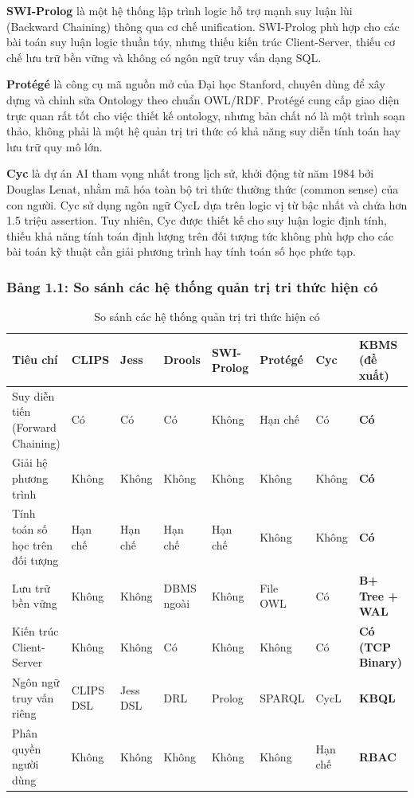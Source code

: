 \documentclass[13pt,a4paper,oneside]{extreport}
\begin{document}
\textbf{SWI-Prolog} \cite{SWIProlog} là một hệ thống lập trình logic hỗ trợ mạnh suy luận lùi (Backward Chaining) thông qua cơ chế unification. SWI-Prolog phù hợp cho các bài toán suy luận logic thuần túy, nhưng thiếu kiến trúc Client-Server, thiếu cơ chế lưu trữ bền vững và không có ngôn ngữ truy vấn dạng SQL.


\textbf{Protégé} \cite{StanfordProtege} là công cụ mã nguồn mở của Đại học Stanford, chuyên dùng để xây dựng và chỉnh sửa Ontology theo chuẩn OWL/RDF. Protégé cung cấp giao diện trực quan rất tốt cho việc thiết kế ontology, nhưng bản chất nó là một trình soạn thảo, không phải là một hệ quản trị tri thức có khả năng suy diễn tính toán hay lưu trữ quy mô lớn.


\textbf{Cyc} \cite{LenatCyc} là dự án AI tham vọng nhất trong lịch sử, khởi động từ năm 1984 bởi Douglas Lenat, nhằm mã hóa toàn bộ tri thức thường thức (common sense) của con người. Cyc sử dụng ngôn ngữ CycL dựa trên logic vị từ bậc nhất và chứa hơn 1.5 triệu assertion. Tuy nhiên, Cyc được thiết kế cho suy luận logic định tính, thiếu khả năng tính toán định lượng trên đối tượng  tức không phù hợp cho các bài toán kỹ thuật cần giải phương trình hay tính toán số học phức tạp.


\subsubsection{Bảng 1.1: So sánh các hệ thống quản trị tri thức hiện có}


\begin{table}[H]
  \centering\captionsetup{position=below}\footnotesize\selectfont
  \begin{tabularx}{\textwidth}{|l|L|L|L|L|L|L|L|}
  \hline
Tiêu chí & CLIPS & Jess & Drools & SWI-Prolog & Protégé & Cyc & \textbf{KBMS (đề xuất)} \\ \hline
Suy diễn tiến (Forward Chaining) & Có & Có & Có & Không & Hạn chế & Có & \textbf{Có} \\ \hline
Giải hệ phương trình & Không & Không & Không & Không & Không & Không & \textbf{Có} \\ \hline
Tính toán số học trên đối tượng & Hạn chế & Hạn chế & Hạn chế & Hạn chế & Không & Không & \textbf{Có} \\ \hline
Lưu trữ bền vững & Không & Không & DBMS ngoài & Không & File OWL & Có & \textbf{B+ Tree + WAL} \\ \hline
Kiến trúc Client-Server & Không & Không & Có & Không & Không & Có & \textbf{Có (TCP Binary)} \\ \hline
Ngôn ngữ truy vấn riêng & CLIPS DSL & Jess DSL & DRL & Prolog & SPARQL & CycL & \textbf{KBQL} \\ \hline
Phân quyền người dùng & Không & Không & Không & Không & Không & Hạn chế & \textbf{RBAC} \\ \hline
  \end{tabularx}
  \caption{So sánh các hệ thống quản trị tri thức hiện có}\label{tbl:so-sánh-các-hệ-thống-quản-trị-tri-thức-hiện-có}
\end{table}
\end{document}
